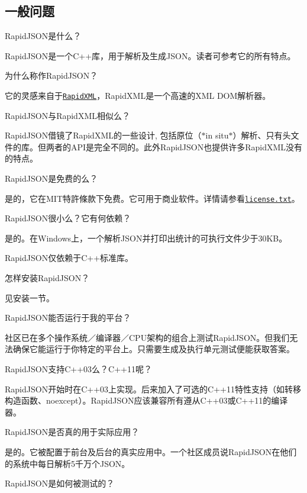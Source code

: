 \subsection*{一般问题}


\begin{DoxyEnumerate}
\item Rapid\+J\+S\+O\+N是什么？

Rapid\+J\+S\+O\+N是一个\+C++库，用于解析及生成\+J\+S\+O\+N。读者可参考它的所有特点。
\item 为什么称作\+Rapid\+J\+S\+O\+N？

它的灵感来自于\href{http://rapidxml.sourceforge.net/}{\tt Rapid\+X\+ML}，\+Rapid\+X\+M\+L是一个高速的\+X\+ML D\+O\+M解析器。
\item Rapid\+J\+S\+O\+N与\+Rapid\+X\+M\+L相似么？

Rapid\+J\+S\+O\+N借镜了\+Rapid\+X\+M\+L的一些设计, 包括原位（$\ast$in situ$\ast$）解析、只有头文件的库。但两者的\+A\+P\+I是完全不同的。此外\+Rapid\+J\+S\+O\+N也提供许多\+Rapid\+X\+M\+L没有的特点。
\item Rapid\+J\+S\+O\+N是免费的么？

是的，它在\+M\+I\+T特許條款下免费。它可用于商业软件。详情请参看\href{https://github.com/miloyip/rapidjson/blob/master/license.txt}{\tt license.\+txt}。
\item Rapid\+J\+S\+O\+N很小么？它有何依赖？

是的。在\+Windows上，一个解析\+J\+S\+O\+N并打印出统计的可执行文件少于30\+K\+B。

Rapid\+J\+S\+O\+N仅依赖于\+C++标准库。
\item 怎样安装\+Rapid\+J\+S\+O\+N？

见安装一节。
\item Rapid\+J\+S\+O\+N能否运行于我的平台？

社区已在多个操作系统／编译器／\+C\+P\+U架构的组合上测试\+Rapid\+J\+S\+O\+N。但我们无法确保它能运行于你特定的平台上。只需要生成及执行单元测试便能获取答案。
\item Rapid\+J\+S\+O\+N支持\+C++03么？\+C++11呢？

Rapid\+J\+S\+O\+N开始时在\+C++03上实现。后来加入了可选的\+C++11特性支持（如转移构造函数、{\ttfamily noexcept}）。\+Rapid\+J\+S\+O\+N应该兼容所有遵从\+C++03或\+C++11的编译器。
\item Rapid\+J\+S\+O\+N是否真的用于实际应用？

是的。它被配置于前台及后台的真实应用中。一个社区成员说\+Rapid\+J\+S\+O\+N在他们的系统中每日解析5千万个\+J\+S\+O\+N。
\item Rapid\+J\+S\+O\+N是如何被测试的？


\end{DoxyEnumerate}
